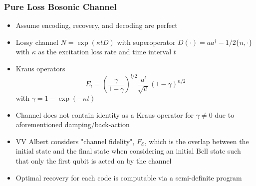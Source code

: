 \documentclass{beamer}
\newcommand\0{\mathbf{0}}
\begin{document}
\begin{frame}
\frametitle{Pure Loss Bosonic Channel}
\begin{itemize}
\item Assume encoding, recovery, and decoding are perfect
\item Lossy channel $N = \exp(\kappa t D)$ with superoperator $D(\cdot) = a a^\dag - 1/2 \{ n , \cdot \}$ with $\kappa$ as the excitation loss rate and time interval $t$
\item Kraus operators
$$
E_l = (\frac{\gamma}{1-\gamma})^{l / 2} \frac{a^l}{\sqrt{l!}}(1 - \gamma)^{n / 2}
$$
with $\gamma = 1 - \exp(- \kappa t)$

\item Channel does not contain identity as a Kraus operator for $\gamma \neq 0$ due to aforementioned damping/back-action
\item VV Albert considers "channel fidelity", $F_\mathcal{E}$, which is the overlap between the initial state and the final state when considering an initial Bell state such that only the first qubit is acted on by the channel
\item Optimal recovery for each code is computable via a semi-definite program
\end{itemize}
\end{frame}
\end{document}
